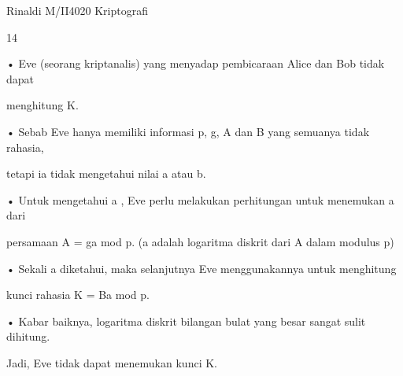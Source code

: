 \documentclass{article}
\begin{document}

Rinaldi M/II4020 Kriptografi

14

• Eve (seorang kriptanalis) yang menyadap pembicaraan Alice dan Bob tidak dapat 

menghitung K. 

• Sebab Eve hanya memiliki informasi p, g, A dan B yang semuanya tidak rahasia, 

tetapi ia tidak mengetahui nilai a atau b.  

• Untuk mengetahui a , Eve perlu melakukan perhitungan untuk menemukan a dari 

persamaan A = ga mod p.   (a adalah logaritma diskrit dari A dalam modulus p)

• Sekali a diketahui, maka selanjutnya Eve menggunakannya untuk menghitung 

kunci rahasia K = Ba mod p. 

• Kabar baiknya, logaritma diskrit bilangan bulat yang besar sangat sulit dihitung. 

Jadi, Eve tidak dapat menemukan kunci K.
\end{document}

